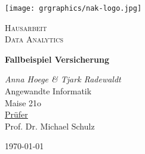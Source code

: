 \begin{titlepage}
	\centering
	\texttt{[image: grgraphics/nak-logo.jpg]}\par\vspace{1cm}
	\vspace{1cm}
	{\scshape\Large Hausarbeit \\ Data Analytics\par}
	\vspace{1.5cm}
	{\huge\bfseries Fallbeispiel Versicherung \par}
	\vspace{10mm}
	{\Large\itshape Anna Hoege \& Tjark Radewaldt\\}
	\vspace{10mm}
  {\Large Angewandte Informatik \\ \vspace{1mm} \large Maise 21o}
  \vspace{20mm}\\
	\underline{Prüfer} \\
  \vspace{3mm}
	\large  Prof. Dr. Michael Schulz

	\vfill

	{\large \today\par}

\end{titlepage}